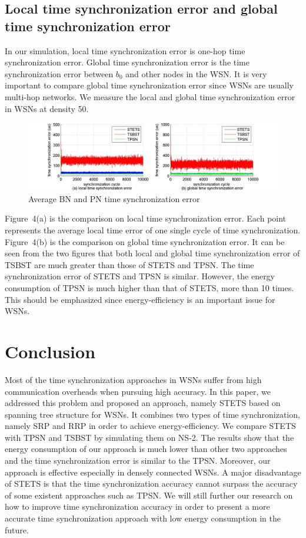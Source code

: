\documentclass[runningheads,a4paper]{llncs}
\begin{document}
\subsection{Local time synchronization error and global time synchronization error}
In our simulation, local time synchronization error is one-hop time synchronization error. Global time synchronization error is the time synchronization error between $b_{0}$ and other nodes in the WSN. It is very important to compare global time synchronization error since WSNs are usually multi-hop networks. We measure the local and global time synchronization error in WSNs at density 50.


\begin{figure}[t]
\centering
\includegraphics[width=\textwidth]{fig4.jpg}
\caption{Average BN and PN time synchronization error}
\label{fig_sim}
\end{figure}


Figure~4(a) is the comparison on local time synchronization error. Each point represents the average local time error of one single cycle of time synchronization. Figure~4(b) is the comparison on global time synchronization error. It can be seen from the two figures that both local and global time synchronization error of TSBST are much greater than those of STETS and TPSN. The time synchronization error of STETS and TPSN is similar. However, the energy consumption of TPSN is much higher than that of STETS, more than 10 times. This should be emphasized since energy-efficiency is an important issue for WSNs.


\section{Conclusion}
Most of the time synchronization approaches in WSNs suffer from high communication overheads when pursuing high accuracy. In this paper, we addressed this problem and proposed an approach, namely STETS based on spanning tree structure for WSNs. It combines two types of time synchronization, namely SRP and RRP in order to achieve energy-efficiency. We compare STETS with TPSN and TSBST by simulating them on NS-2. The results show that the energy consumption of our approach is much lower than other two approaches and the time synchronization error is similar to the TPSN. Moreover, our approach is effective especially in densely connected WSNs. A major disadvantage of STETS is that the time synchronization accuracy cannot surpass the accuracy of some existent approaches such as TPSN. We will still further our research on how to improve time synchronization accuracy in order to present a more accurate time synchronization approach with low energy consumption in the future.
\end{document}
